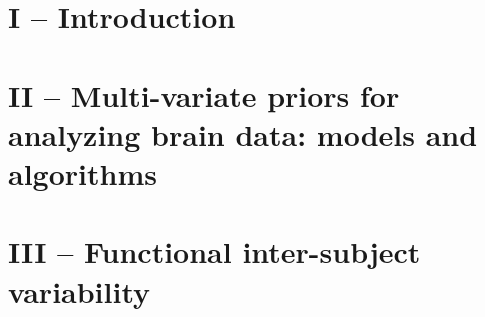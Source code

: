 \documentclass[nobib, a4paper, notoc, twoside, justified, openany]{tufte-book}
\newtheorem{theorem}{Theorem}
\DeclareMathOperator{\dom}{dom}
\DeclareMathOperator{\conv}{conv}
\DeclareMathOperator{\inte}{int }
\begin{document}



\part{\Huge{I -- Introduction}}



\part{\Huge{II -- Multi-variate priors for analyzing brain data: models and algorithms}}



\part{\Huge{III -- Functional inter-subject variability}}
\end{document}
